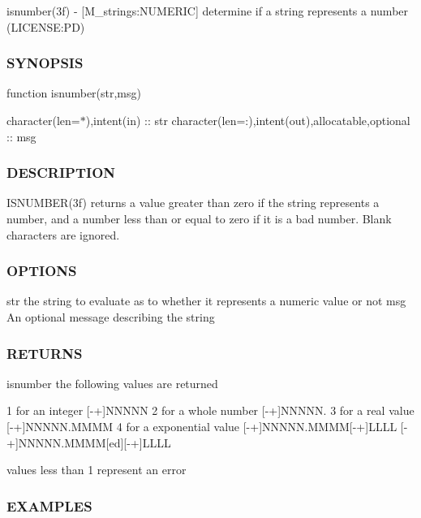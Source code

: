 isnumber(3f) -\/ \mbox{[}M\+\_\+strings\+:N\+U\+M\+E\+R\+IC\mbox{]} determine if a string represents a number (L\+I\+C\+E\+N\+SE\+:PD) \subsubsection*{S\+Y\+N\+O\+P\+S\+IS}

function isnumber(str,msg)

character(len=$\ast$),intent(in) \+:\+: str character(len=\+:),intent(out),allocatable,optional \+:\+: msg \subsubsection*{D\+E\+S\+C\+R\+I\+P\+T\+I\+ON}

I\+S\+N\+U\+M\+B\+E\+R(3f) returns a value greater than zero if the string represents a number, and a number less than or equal to zero if it is a bad number. Blank characters are ignored. \subsubsection*{O\+P\+T\+I\+O\+NS}

str the string to evaluate as to whether it represents a numeric value or not msg An optional message describing the string \subsubsection*{R\+E\+T\+U\+R\+NS}

isnumber the following values are returned \begin{DoxyVerb}       1 for an integer             [-+]NNNNN
       2 for a whole number         [-+]NNNNN.
       3 for a real value           [-+]NNNNN.MMMM
       4 for a exponential value    [-+]NNNNN.MMMM[-+]LLLL
                                    [-+]NNNNN.MMMM[ed][-+]LLLL

      values less than 1 represent an error
\end{DoxyVerb}


\subsubsection*{E\+X\+A\+M\+P\+L\+ES}


